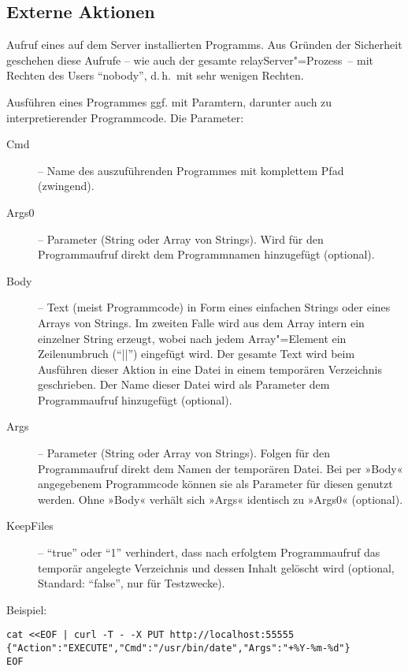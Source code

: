 \documentclass[titlepage=false,toc=nobibliography]{vl-report}
\newcommand*\theServer{relayServer}
\newcommand*\action[1]{\fbox{\nolinkurl{#1}}\medskip\par}
\begin{document}
\subsection{Externe Aktionen}

Aufruf eines auf dem Server installierten Programms. Aus Gründen der Sicherheit 
geschehen diese Aufrufe -- wie auch der gesamte \theServer"=Prozess~-- mit 
Rechten des Users "`nobody"', d.\,h.\ mit sehr wenigen Rechten. 

\begin{description}
  \item \action{EXECUTE}
    \noindent Ausführen eines Programmes ggf. mit Paramtern, darunter auch zu 
    interpretierender Programmcode. Die Parameter:
    \begin{description}
      \item[Cmd] -- Name des auszuführenden Programmes mit komplettem Pfad 
      (zwingend).
      \item[Args0] -- Parameter (String oder Array von Strings). Wird für 
      den Programmaufruf direkt dem Programmnamen hinzugefügt (optional). 
      \item[Body] -- Text (meist Programmcode) in Form eines einfachen Strings 
      oder eines Arrays von Strings. Im zweiten Falle wird aus dem Array intern 
      ein einzelner String erzeugt, wobei nach jedem Array"=Element ein 
      Zeilenumbruch ("`|\n|"') eingefügt wird. Der gesamte Text wird beim 
      Ausführen dieser Aktion in eine Datei in einem temporären Verzeichnis 
      geschrieben. Der Name dieser Datei wird als Parameter dem Programmaufruf 
      hinzugefügt (optional). 
      \item[Args] -- Parameter (String oder Array von Strings). Folgen für den 
      Programmaufruf direkt dem Namen der temporären Datei. Bei per »Body« 
      angegebenem Programmcode können sie als Parameter für diesen genutzt 
      werden. Ohne »Body« verhält sich »Args« identisch zu »Args0« (optional).
      \item[KeepFiles] -- "`true"' oder "`1"' verhindert, dass nach erfolgtem 
      Programmaufruf das temporär angelegte Verzeichnis und dessen Inhalt 
      gelöscht wird (optional, Standard: "`false"', nur für Testzwecke). 
    \end{description}
\end{description}
Beispiel:
\begin{lstlisting}[language={}]
cat <<EOF | curl -T - -X PUT http://localhost:55555
{"Action":"EXECUTE","Cmd":"/usr/bin/date","Args":"+%Y-%m-%d"}
EOF
\end{lstlisting}
\end{document}
